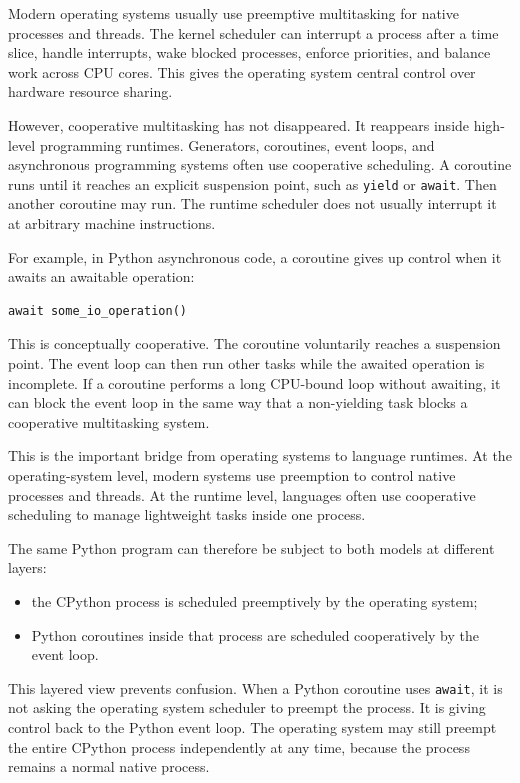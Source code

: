 Modern operating systems usually use preemptive multitasking for native processes and threads. The kernel scheduler can interrupt a process after a time slice, handle interrupts, wake blocked processes, enforce priorities, and balance work across CPU cores. This gives the operating system central control over hardware resource sharing.

However, cooperative multitasking has not disappeared. It reappears inside high-level programming runtimes. Generators, coroutines, event loops, and asynchronous programming systems often use cooperative scheduling. A coroutine runs until it reaches an explicit suspension point, such as \texttt{yield} or \texttt{await}. Then another coroutine may run. The runtime scheduler does not usually interrupt it at arbitrary machine instructions.

For example, in Python asynchronous code, a coroutine gives up control when it awaits an awaitable operation:

\begin{verbatim}
await some_io_operation()
\end{verbatim}

This is conceptually cooperative. The coroutine voluntarily reaches a suspension point. The event loop can then run other tasks while the awaited operation is incomplete. If a coroutine performs a long CPU-bound loop without awaiting, it can block the event loop in the same way that a non-yielding task blocks a cooperative multitasking system.

This is the important bridge from operating systems to language runtimes. At the operating-system level, modern systems use preemption to control native processes and threads. At the runtime level, languages often use cooperative scheduling to manage lightweight tasks inside one process.

The same Python program can therefore be subject to both models at different layers:

\begin{itemize}
    \item the CPython process is scheduled preemptively by the operating system;
    \item Python coroutines inside that process are scheduled cooperatively by the event loop.
\end{itemize}

This layered view prevents confusion. When a Python coroutine uses \texttt{await}, it is not asking the operating system scheduler to preempt the process. It is giving control back to the Python event loop. The operating system may still preempt the entire CPython process independently at any time, because the process remains a normal native process.

